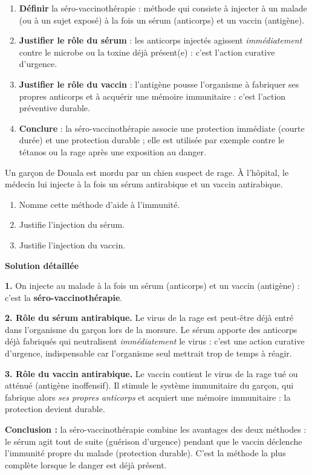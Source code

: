 \documentclass[11pt]{article}
\newcommand{\cle}[1]{{\popxbold\color{popdark}#1}}
\begin{document}
\begin{methode}
\begin{enumerate}
\item \textbf{Définir} la séro-vaccinothérapie : méthode qui consiste à injecter à un malade (ou à un sujet exposé) à la fois un sérum (anticorps) et un vaccin (antigène).
\item \textbf{Justifier le rôle du sérum} : les anticorps injectés agissent \emph{immédiatement} contre le microbe ou la toxine déjà présent(e) : c'est l'action curative d'urgence.
\item \textbf{Justifier le rôle du vaccin} : l'antigène pousse l'organisme à fabriquer ses propres anticorps et à acquérir une mémoire immunitaire : c'est l'action préventive durable.
\item \textbf{Conclure} : la séro-vaccinothérapie associe une protection immédiate (courte durée) et une protection durable ; elle est utilisée par exemple contre le tétanos ou la rage après une exposition au danger.
\end{enumerate}
\end{methode}

\begin{exoresolu}
Un garçon de Douala est mordu par un chien suspect de rage. À l'hôpital, le médecin lui injecte à la fois un sérum antirabique et un vaccin antirabique.
\begin{enumerate}
\item Nomme cette méthode d'aide à l'immunité.
\item Justifie l'injection du sérum.
\item Justifie l'injection du vaccin.
\end{enumerate}
\tcblower
\textbf{Solution détaillée}

\textbf{1.} On injecte au malade à la fois un sérum (anticorps) et un vaccin (antigène) : c'est la \textbf{séro-vaccinothérapie}.

\textbf{2. Rôle du sérum antirabique.} Le virus de la rage est peut-être déjà entré dans l'organisme du garçon lors de la morsure. Le sérum apporte des \cle{anticorps} déjà fabriqués qui neutralisent \emph{immédiatement} le virus : c'est une action curative d'urgence, indispensable car l'organisme seul mettrait trop de temps à réagir.

\textbf{3. Rôle du vaccin antirabique.} Le vaccin contient le virus de la rage tué ou atténué (antigène inoffensif). Il stimule le système immunitaire du garçon, qui fabrique alors \emph{ses propres anticorps} et acquiert une mémoire immunitaire : la protection devient durable.

\textbf{Conclusion :} la séro-vaccinothérapie combine les avantages des deux méthodes : le sérum agit tout de suite (guérison d'urgence) pendant que le vaccin déclenche l'immunité propre du malade (protection durable). C'est la méthode la plus complète lorsque le danger est déjà présent.
\end{exoresolu}
\end{document}
